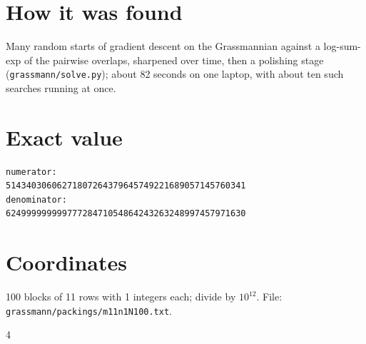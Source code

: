 \documentclass[11pt,a4paper]{article}
\begin{document}
\section{How it was found}
Many random starts of gradient descent on the Grassmannian against a log-sum-exp of the pairwise overlaps, sharpened over time, then a polishing stage (\texttt{grassmann/solve.py}); about 82 seconds on one laptop, with about ten such searches running at once.


\appendix
\section{Exact value}
{\small
\begin{verbatim}
numerator:
51434030606271807264379645749221689057145760341
denominator:
62499999999977728471054864243263248997457971630
\end{verbatim}}

\section{Coordinates}
100 blocks of 11 rows with 1 integers each; divide by $10^{12}$. File: \texttt{grassmann/packings/m11n1N100.txt}.
{\tiny
\begin{multicols}{4}
\end{multicols}}
\end{document}
